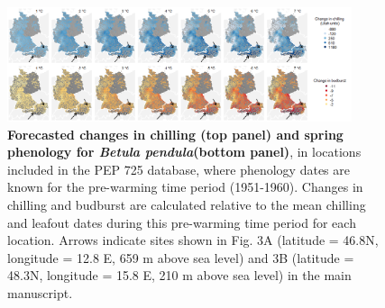 \documentclass{article}
\begin{document}
\begin{figure}[h!]
\centering
\noindent \includegraphics[width=0.90\textwidth]{..//..//analyses/bb_analysis/figures/forecasting/heatmapsbetpepfinalarrows.png}
\caption{\textbf{Forecasted changes in chilling (top panel) and spring phenology for \emph{Betula pendula}(bottom panel)}, in locations included in the PEP 725 database, where phenology dates are known for the pre-warming time period (1951-1960). Changes in chilling and budburst are calculated relative to the mean chilling and leafout dates during this pre-warming time period for each location. Arrows indicate sites shown in Fig. 3A (latitude = 46.8\degree N, longitude =  12.8 \degree E, 659 m above sea level) and 3B (latitude = 48.3\degree N, longitude =  15.8 \degree E, 210 m above sea level) in the main manuscript.} 

\label{fig:foremap}
\end{figure}
\end{document}

